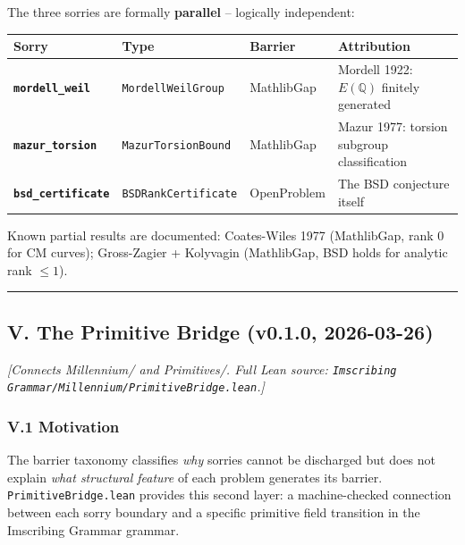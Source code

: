 \documentclass[12pt,a4paper]{article}
\begin{document}
The three sorries are formally \textbf{parallel}  --  logically independent:

\begin{table}[htbp]
\centering
\small
{}
\begin{tabularx}{\textwidth}{>{\centering\arraybackslash}X >{\centering\arraybackslash}X >{\centering\arraybackslash}X >{\centering\arraybackslash}X}
\toprule
\rowcolor{gray!25}\textbf{Sorry} & \textbf{Type} & \textbf{Barrier} & \textbf{Attribution} \\
\midrule
\rowcolors{1}{white}{gray!10}
\textbf{\texttt{mordell\_weil}} & \texttt{MordellWeilGroup} & MathlibGap & Mordell 1922: $E(\mathbb{Q})$ finitely generated \\
\textbf{\texttt{mazur\_torsion}} & \texttt{MazurTorsionBound} & MathlibGap & Mazur 1977: torsion subgroup classification \\
\textbf{\texttt{bsd\_certificate}} & \texttt{BSDRankCertificate} & OpenProblem & The BSD conjecture itself \\
\bottomrule
\end{tabularx}
\end{table}

Known partial results are documented: Coates-Wiles 1977 (MathlibGap, rank 0 for CM curves); Gross-Zagier + Kolyvagin (MathlibGap, BSD holds for analytic rank $\leq 1$).

\begin{center}
\rule{0.5\textwidth}{0.4pt}
\end{center}

\subsection{V. The Primitive Bridge (v0.1.0, 2026-03-26)}

\emph{{[}Connects Millennium/ and Primitives/. Full Lean source: \texttt{Imscribing Grammar/Millennium/PrimitiveBridge.lean}.{]}}

\subsubsection{V.1 Motivation}

The barrier taxonomy classifies \emph{why} sorries cannot be discharged but does not explain \emph{what structural feature} of each problem generates its barrier. \texttt{PrimitiveBridge.lean} provides this second layer: a machine-checked connection between each sorry boundary and a specific primitive field transition in the Imscribing Grammar grammar.
\end{document}
